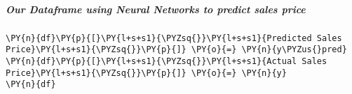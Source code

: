     \hypertarget{our-dataframe-using-neural-networks-to-predict-sales-price}{%
\subparagraph{Our Dataframe using Neural Networks to predict sales
price}\label{our-dataframe-using-neural-networks-to-predict-sales-price}}

    \begin{tcolorbox}[breakable, size=fbox, boxrule=1pt, pad at break*=1mm,colback=cellbackground, colframe=cellborder]
\begin{Verbatim}[commandchars=\\\{\}]
\PY{n}{df}\PY{p}{[}\PY{l+s+s1}{\PYZsq{}}\PY{l+s+s1}{Predicted Sales Price}\PY{l+s+s1}{\PYZsq{}}\PY{p}{]} \PY{o}{=} \PY{n}{y\PYZus{}pred}
\PY{n}{df}\PY{p}{[}\PY{l+s+s1}{\PYZsq{}}\PY{l+s+s1}{Actual Sales Price}\PY{l+s+s1}{\PYZsq{}}\PY{p}{]} \PY{o}{=} \PY{n}{y}
\PY{n}{df}
\end{Verbatim}
\end{tcolorbox}

